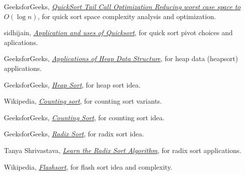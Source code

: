 \documentclass[12pt]{article}
\begin{document}
\begin{thebibliography}{99}
     GeeksforGeeks, \href{https://www.geeksforgeeks.org/quicksort-tail-call-optimization-reducing-worst-case-space-log-n/}{\emph{QuickSort Tail Call Optimization Reducing worst case space to $O(\log n)$}}, for quick sort space complexity analysis and optimization.

     sidhijain, \href{https://www.geeksforgeeks.org/application-and-uses-of-quicksort/#:~:text=It%20is%20used%20in%20operational,sort%20is%20used%20for%20sorting.}{\emph{Application and uses of Quicksort}}, for quick sort pivot choices and aplications.

     GeeksforGeeks, \href{https://www.geeksforgeeks.org/applications-of-heap-data-structure/}{\emph{Applications of Heap Data Structure}}, for heap data (heapsort) applications.

     GeeksforGeeks, \href{https://www.geeksforgeeks.org/heap-sort/}{\emph{Heap Sort}}, for heap sort idea.

     Wikipedia, \href{https://en.wikipedia.org/wiki/Counting_sort}{\emph{Counting sort}}, for counting sort variants.

     GeeksforGeeks, \href{https://www.geeksforgeeks.org/counting-sort/}{\emph{Counting Sort}}, for counting sort idea.

     GeeksforGeeks, \href{https://www.geeksforgeeks.org/radix-sort/}{\emph{Radix Sort}}, for radix sort idea.

     Tanya Shrivastava, \href{https://www.interviewkickstart.com/learn/radix-sort-algorithm}{\emph{Learn the Radix Sort Algorithm}}, for radix sort applications.

     Wikipedia, \href{https://en.wikipedia.org/wiki/Flashsort}{\emph{Flashsort}}, for flash sort idea and complexity.

\end{thebibliography}
\end{document}

